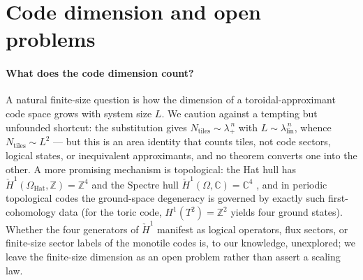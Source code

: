 \documentclass[a4paper,unpublished]{quantumarticle}
\theoremstyle{remark}
\newcommand{\OHat}{\Omega_{\mathrm{Hat}}}
\newcommand{\CC}{\mathbb{C}}
\newcommand{\ZZ}{\mathbb{Z}}
\begin{document}
\section{Code dimension and open problems}
\label{sec:discussion}

\paragraph{What does the code dimension count?}
A natural finite-size question is how the dimension of a
toroidal-approximant code space grows with system size $L$. We
caution against a tempting but unfounded shortcut: the substitution
gives $N_{\mathrm{tiles}} \sim \lambda_{+}^{\,n}$ with
$L \sim \lambda_{\mathrm{lin}}^{\,n}$, whence
$N_{\mathrm{tiles}} \sim L^{2}$ --- but this is an area identity that
counts tiles, not code sectors, logical states, or inequivalent
approximants, and no theorem converts one into the other. A more
promising mechanism is topological: the Hat hull has
$\check{H}^{1}(\OHat, \ZZ) = \ZZ^{4}$ \cite{BGS2025} and the Spectre
hull $\check{H}^{1}(\Omega, \CC) = \CC^{4}$ \cite{BGMS2025}, and in
periodic topological codes the ground-space degeneracy is governed by
exactly such first-cohomology data (for the toric code,
$H^{1}(T^{2}) = \ZZ^{2}$ yields four ground states). Whether the four
generators of $\check{H}^{1}$ manifest as logical operators, flux
sectors, or finite-size sector labels of the monotile codes is, to
our knowledge, unexplored; we leave the finite-size dimension as an
open problem rather than assert a scaling law.
\end{document}
